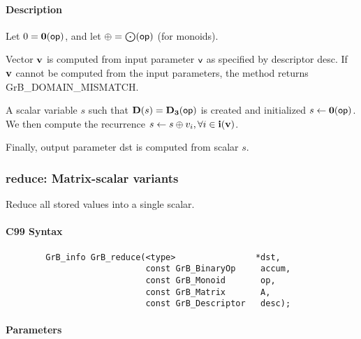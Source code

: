 \paragraph{Description}


Let $0 = \bold{0}({\sf op})$, and let $\oplus = \bigodot({\sf op})$ (for monoids).

Vector ${\bf v}$ is computed from input parameter ${\sf v}$ as
specified by descriptor {\sf desc}. If ${\bf v}$ cannot be computed
from the input parameters, the method returns {\sf GrB\_DOMAIN\_MISMATCH}.

A scalar variable $s$ such that $\bold{D}(s) = \bold{D_3}({\sf op})$ is
created and initialized $s \leftarrow \bold{0}({\sf op})$. 
We then compute the recurrence $s \leftarrow s \oplus v_i, \forall i \in {\bf i}({\bf v})$.

Finally, output parameter {\sf dst} is computed from scalar $s$.

\subsubsection{{\sf reduce}: Matrix-scalar variants}

Reduce all stored values into a single scalar.

\paragraph{C99 Syntax}

\begin{verbatim}
        GrB_info GrB_reduce(<type>                *dst,
                            const GrB_BinaryOp     accum,
                            const GrB_Monoid       op,
                            const GrB_Matrix       A,
                            const GrB_Descriptor   desc);
\end{verbatim}


\paragraph{Parameters}

